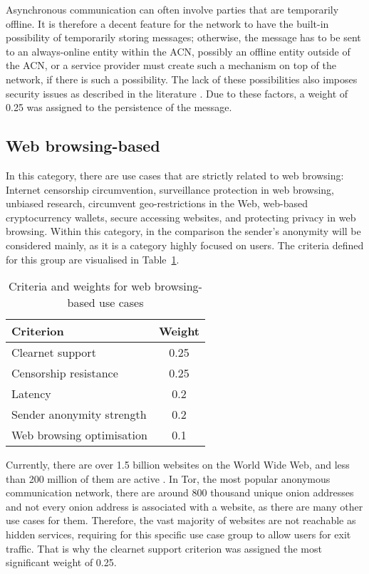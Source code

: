 Asynchronous communication can often involve parties that are temporarily offline. It is therefore a decent feature for the network to have the built-in possibility of temporarily storing messages; otherwise, the message has to be sent to an always-online entity within the ACN, possibly an offline entity outside of the ACN, or a service provider must create such a mechanism on top of the network, if there is such a possibility. The lack of these possibilities also imposes security issues as described in the literature \cite{two-cents-post-office}. Due to these factors, a weight of 0.25 was assigned to the persistence of the message.

\subsection{Web browsing-based}
In this category, there are use cases that are strictly related to web browsing: Internet censorship circumvention, surveillance protection in web browsing, unbiased research, circumvent geo-restrictions in the Web, web-based cryptocurrency wallets, secure accessing websites, and protecting privacy in web browsing.
Within this category, in the comparison the sender's anonymity will be considered mainly, as it is a category highly focused on users.
The criteria defined for this group are visualised in Table~\ref{tab:web_browsing_criteria}.

\begin{table}[!ht]
\centering
\caption{Criteria and weights for web browsing-based use cases}
\begin{tabular}{|l|c|}
\hline
\textbf{Criterion} & \textbf{Weight} \\
\hline
Clearnet support & 0.25 \\
Censorship resistance & 0.25 \\
Latency & 0.2 \\
Sender anonymity strength & 0.2 \\
Web browsing optimisation & 0.1 \\
\hline
\end{tabular}
\label{tab:web_browsing_criteria}
\end{table}

Currently, there are over 1.5 billion websites on the World Wide Web, and less than 200 million of them are active \cite{internetlivestats}. In Tor, the most popular anonymous communication network, there are around 800 thousand unique onion addresses \cite{tor-metrics, tor-metrics2} and not every onion address is associated with a website, as there are many other use cases for them. Therefore, the vast majority of websites are not reachable as hidden services, requiring for this specific use case group to allow users for exit traffic. That is why the clearnet support criterion was assigned the most significant weight of 0.25.
    
